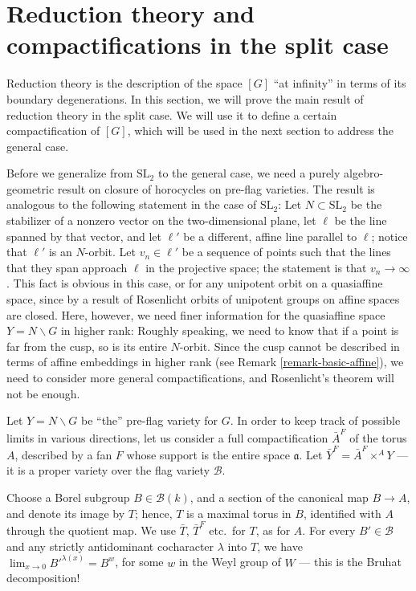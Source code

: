 




\section{Reduction theory and compactifications in the split case}
\label{section-reduction-theory-split}

Reduction theory is the description of the space $[G]$ ``at infinity'' in terms of its boundary degenerations. 
In this section, we will prove the main result of reduction theory in the split case. We will use it to define a certain compactification of $[G]$, which will be used in the next section to address the general case.

Before we generalize from $\text{SL}_2$ to the general case, we need a purely algebro-geometric result on closure of horocycles on pre-flag varieties. The result is analogous to the following statement in the case of $\text{SL}_2$: Let $N\subset \text{SL}_2$ be the stabilizer of a nonzero vector on the two-dimensional plane, let $\ell$ be the line spanned by that vector, and let $\ell'$ be a different, affine line parallel to $\ell$; notice that $\ell'$ is an $N$-orbit. Let $v_n \in \ell'$ be a sequence of points such that the lines that they span approach $\ell$ in the projective space; the statement is that $v_n\to \infty$. This fact is obvious in this case, or for any unipotent orbit on a quasiaffine space, since by a result of Rosenlicht \cite{Rosenlicht-quotient-varieties} orbits of unipotent groups on affine spaces are closed. Here, however, we need finer information for the quasiaffine space $Y=N\backslash G$ in higher rank: Roughly speaking, we need to know that if a point is far from the cusp, so is its entire $N$-orbit. Since the cusp cannot be described in terms of affine embeddings in higher rank (see Remark \ref{remark-basic-affine}), we need to consider more general compactifications, and Rosenlicht's theorem will not be enough.

Let $Y=N\backslash G$ be ``the'' pre-flag variety for $G$. In order to keep track of possible limits in various directions, let us consider a full compactification $\bar A^F$ of the torus $A$, described by a fan $F$ whose support is the entire space $\mathfrak a$. Let $\bar Y^F = \bar A^F \times^A Y$ --- it is a proper variety over the flag variety $\mathcal B$.

Choose a Borel subgroup $B\in \mathcal B(k)$, and a section of the canonical map $B\to A$, and denote its image by $T$; hence, $T$ is a maximal torus in $B$, identified with $A$ through the quotient map. We use $\bar T$, $\bar T^F$ etc.\ for $T$, as for $A$. For every $B'\in \mathcal B$ and any strictly antidominant cocharacter $\lambda$ into $T$, we have $\lim_{x \to 0} B'^{\lambda(x)} = B^w$, for some $w$ in the Weyl group of $W$ --- this is the Bruhat decomposition!  


